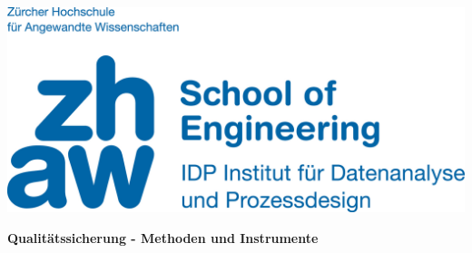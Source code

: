 \noindent
\begin{minipage}[t]{0.4\textwidth} 
\includegraphics[width=\linewidth]{logo.jpg}
\end{minipage}%
\hfill%
\begin{minipage}[t]{0.4\textwidth}\raggedleft
\end{minipage}


\begin{center}
 \textbf{\large Qualitätssicherung - Methoden und Instrumente} \\
 \vspace{0.3cm}
\end{center}
